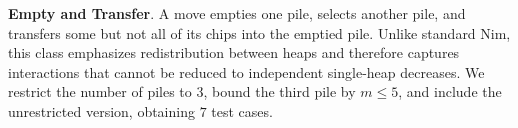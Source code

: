 \documentclass[review]{elsarticle}
\newcommand{\set}[1]{\{ #1 \}}
\newcommand{\tuple}[1]{\langle {#1} \rangle}
\newcommand{\true}{\top}
\newcommand{\statevar}{\mathcal{X}}
\newcommand{\act}{\mathcal{A}}
\newcommand{\constraint}{\mathcal{C}}
\newcommand{\estate}{\mathcal{E}}
\newcommand{\pre}{\mathtt{pre}}
\newcommand{\eff}{\mathtt{eff}}
\begin{document}
{\color{red}\textbf{Empty and Transfer}. A move empties one pile, selects another pile, and transfers some but not all of its chips into the emptied pile.}
{\color{red}Unlike standard Nim, this class emphasizes redistribution between heaps and therefore captures interactions that cannot be reduced to independent single-heap decreases.}
{\color{red}We restrict the number of piles to $3$, bound the third pile by $m \le 5$, and include the unrestricted version, obtaining $7$ test cases.}
\end{document}
